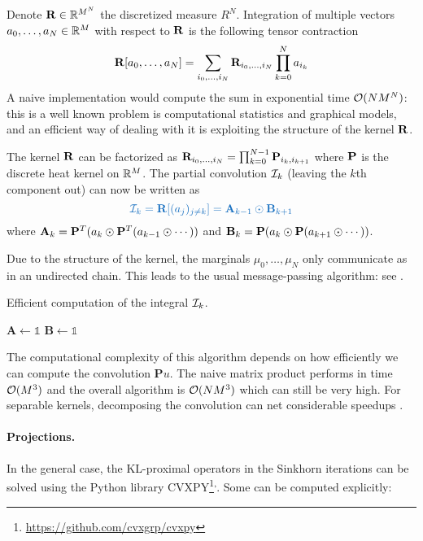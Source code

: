 \documentclass[../report.tex]{subfiles}
\begin{document}
Denote $\mathbf{R} \in \mathbb{R}^{M^N}$ the discretized measure $R^N$. Integration of multiple vectors $a_0,\ldots,a_N\in\mathbb{R}^M$ with respect to $\mathbf{R}$ is the following tensor contraction
\[
	\mathbf{R}[a_0, \ldots, a_N] =
	\sum_{i_0,\ldots,i_N} \mathbf{R}_{i_0,\ldots,i_N}\prod_{k=0}^N a_{i_k}
\]
A naive implementation would compute the sum in exponential time $\mathcal{O}(NM^N)$: this is a well known problem is computational statistics and graphical models, and an efficient way of dealing with it is exploiting the structure of the kernel $\mathbf{R}$.

\begin{prop}
The kernel $\mathbf{R}$ can be factorized as $\mathbf{R}_{i_0,\ldots,i_N} = \prod_{k=0}^{N-1} \mathbf{P}_{i_k,i_{k+1}}$ where $\mathbf{P}$ is the discrete heat kernel on $\mathbb{R}^M$. The partial convolution $\mathcal{I}_k$ (leaving the $k$th component out) can now be written as
\begin{equation}
{\bluefont
	\calI_k = \bfR[(a_j)_{j\neq k}] =
	\mathbf{A}_{k-1} \odot \mathbf{B}_{k+1}
}
\end{equation}
where $\mathbf{A}_{k} = \mathbf{P}^T (a_k \odot \mathbf{P}^T(a_{k-1} \odot \cdots))$ and $\mathbf{B}_k = \mathbf{P} (a_k \odot \mathbf{P} (a_{k+1}\odot \cdots))$.
\end{prop}

Due to the structure of the kernel, the marginals $\mu_0,\ldots,\mu_N$ only communicate as in an undirected chain. This leads to the usual message-passing algorithm: see .
\begin{algorithm}[h]
\caption{Efficient computation of the integral $\mathcal{I}_k$.}\label{algo:EfficientIntegral}
$\mathbf{A} \leftarrow \mathds{1}$\;
$\mathbf{B} \leftarrow \mathds{1}$\;
\;
\end{algorithm}

The computational complexity of this algorithm depends on how efficiently we can compute the convolution $\mathbf{P}u$. The naive matrix product performs in time $\mathcal{O}(M^3)$ and the overall algorithm is $\mathcal{O}(NM^3)$ which can still be very high. For separable kernels, decomposing the convolution can net considerable speedups \parencite[p.~74]{peyr2018computational}.

\paragraph{Projections.}
In the general case, the KL-proximal operators in the Sinkhorn iterations can be solved using the Python library CVXPY\footnote{\url{https://github.com/cvxgrp/cvxpy}}\textsuperscript{,}. Some can be computed explicitly:
\end{document}
